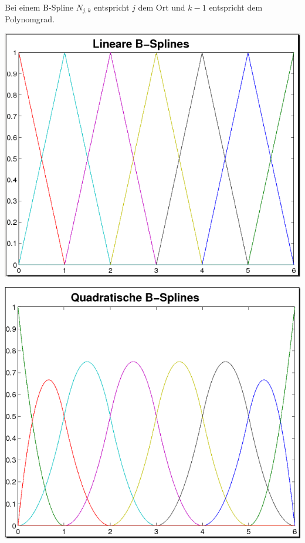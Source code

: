 \label{6.2.6}
Bei einem B-Spline $N_{j,k}$ entspricht $j$ dem Ort und
$k-1$ entspricht dem Polynomgrad.
\begin{image}{}
  \includegraphics[width=\linewidth]{images/linBsplines.png}
\end{image}\label{im6.2.6(1)}
\begin{image}{}
  \includegraphics[width=\linewidth]{images/quadBsplines.png}
\end{image}\label{im6.2.6(2)}
